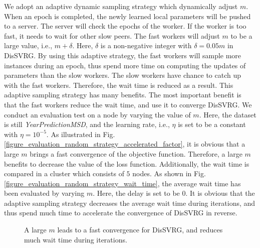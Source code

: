 \documentclass[preprint,review,11pt,a4paper]{elsarticle}
\begin{document}
We adopt an adaptive dynamic sampling strategy which dynamically adjust $m$. When an epoch is completed, the newly learned local parameters will be pushed to a server. The server will check the epochs of the worker. If the worker is too fast, it needs to wait for other slow peers.  The fast workers will adjust  $m$ to be a large value, i.e., $m+\delta$. Here, $\delta$ is a non-negative integer with $\delta=0.05m$ in DisSVRG. By using this adaptive strategy, the fast workers will sample more instances during an epoch, thus spend more time on computing the updates of parameters than the slow workers. The slow workers have chance to catch up with the fast workers. Therefore, the wait time is reduced as a result. This adaptive sampling strategy has many benefits. The most important benefit is that the fast workers reduce the wait time, and use it  to converge DisSVRG. We conduct an evaluation test on a  node by varying the value of $m$. Here, the dataset is still \emph{YearPredictionMSD}, and the learning rate, i.e., $\eta$ is set to be a constant with $\eta=10^{-5}$. As illustrated in Fig. \ref{figure_evaluation_random_strategy_accelerated_factor},  it is obvious that a large $m$ brings a fast convergence of the objective function. Therefore, a large $m$ benefits to decrease the value of the loss function. Additionally, the wait time is compared in a cluster which consists of $5$ nodes.   As shown in Fig. \ref{figure_evaluation_random_strategy_wait_time}, the average wait time has been evaluated by varying $m$. Here, the delay is set to be $0$.  It is obvious that the adaptive sampling strategy  decreases the average wait time during iterations, and thus spend much time to accelerate the convergence of DisSVRG in reverse.

\begin{figure}
\centering
{}
\caption{A large $m$ leads to a fast convergence for DisSVRG, and reduces much wait time during iterations.}
\label{figure_evaluation_random_strategy}
\end{figure}
\end{document}

